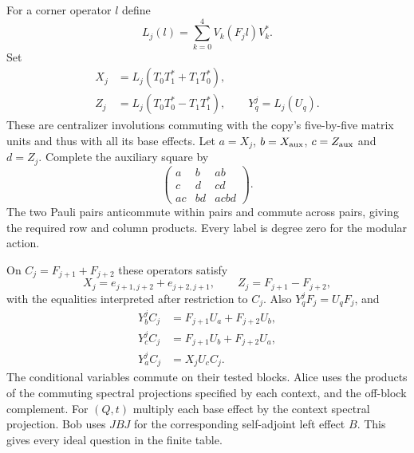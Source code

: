For a corner operator $l$ define
\[
 L_j(l)=\sum_{k=0}^4 V_k(F_jl)V_k^*.
\]
Set
\begin{equation}\label{eq:ideal-labels}
\begin{aligned}
 X_j&=L_j(T_0T_1^*+T_1T_0^*),\\
 Z_j&=L_j(T_0T_0^*-T_1T_1^*),\qquad Y_q^j=L_j(U_q).
\end{aligned}
\end{equation}
These are centralizer involutions commuting with the copy's five-by-five matrix units and thus with all its base effects. Let $a=X_j$, $b=X_{\rm aux}$, $c=Z_{\rm aux}$ and $d=Z_j$. Complete the auxiliary square by
\begin{equation}\label{eq:auxsquare}
 \begin{pmatrix}a&b&ab\\c&d&cd\\ac&bd&acbd\end{pmatrix}.
\end{equation}
The two Pauli pairs anticommute within pairs and commute across pairs, giving the required row and column products. Every label is degree zero for the modular action.

On $C_j=F_{j+1}+F_{j+2}$ these operators satisfy
\[
 X_j=e_{j+1,j+2}+e_{j+2,j+1},\qquad Z_j=F_{j+1}-F_{j+2},
\]
with the equalities interpreted after restriction to $C_j$. Also $Y_q^jF_j=U_qF_j$, and
\[
\begin{aligned}
 Y_b^jC_j&=F_{j+1}U_a+F_{j+2}U_b,\\
 Y_c^jC_j&=F_{j+1}U_b+F_{j+2}U_a,\\
 Y_a^jC_j&=X_jU_cC_j.
\end{aligned}
\]
The conditional variables commute on their tested blocks. Alice uses the products of the commuting spectral projections specified by each context, and the off-block complement. For $(Q,t)$ multiply each base effect by the context spectral projection. Bob uses $JBJ$ for the corresponding self-adjoint left effect $B$. This gives every ideal question in the finite table.

